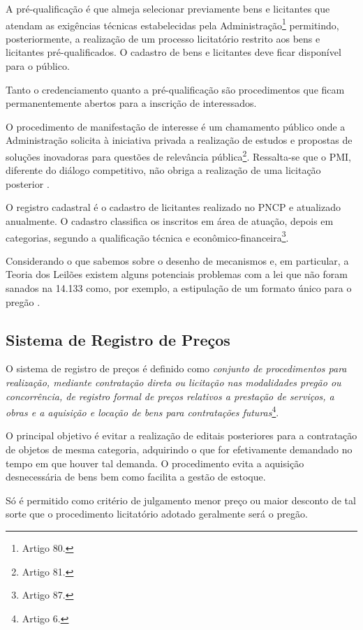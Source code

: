 A pré-qualificação é que almeja selecionar previamente bens e licitantes que atendam as exigências técnicas estabelecidas pela Administração\footnote{Artigo 80.} permitindo, posteriormente, a realização de um processo licitatório restrito aos bens e licitantes pré-qualificados. O cadastro de bens e licitantes deve ficar disponível para o público.

Tanto o credenciamento quanto a pré-qualificação são procedimentos que ficam permanentemente abertos para a inscrição de interessados.

O procedimento de manifestação de interesse é um chamamento público onde a Administração solicita à iniciativa privada a realização de estudos e propostas de soluções inovadoras para questões de relevância pública\footnote{Artigo 81.}. Ressalta-se que o PMI, diferente do diálogo competitivo, não obriga a realização de uma licitação posterior \citet{TCE2022}.

O registro cadastral é o cadastro de licitantes realizado no PNCP e atualizado anualmente. O cadastro classifica os inscritos em área de atuação, depois em categorias, segundo a qualificação técnica e econômico-financeira\footnote{Artigo 87.}.

Considerando o que sabemos sobre o desenho de mecanismos e, em particular, a Teoria dos Leilões existem alguns potenciais problemas com a lei que não foram sanados na 14.133 como, por exemplo, a estipulação de um formato único para o pregão \citet{pellegrini2018:MSc}.

\subsection{Sistema de Registro de Preços}
O sistema de registro de preços é definido como \emph{conjunto de procedimentos para realização, mediante contratação direta ou licitação nas modalidades pregão ou concorrência, de registro formal de preços relativos a prestação de serviços, a obras e a aquisição e locação de bens para contratações futuras}\footnote{Artigo 6.}.

O principal objetivo é evitar a realização de editais posteriores para a contratação de objetos de mesma categoria, adquirindo o que for efetivamente demandado no tempo em que houver tal demanda. O procedimento evita a aquisição desnecessária de bens bem como facilita a gestão de estoque.

Só é permitido como critério de julgamento menor preço ou maior desconto de tal sorte que o procedimento licitatório adotado geralmente será o pregão.

